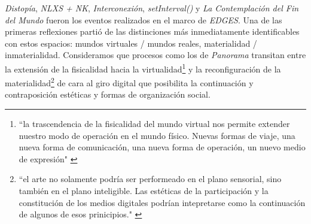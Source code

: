 

\iffalse
\begin{itemize}
\item Distopía
\item domo 
\item Underborders
\item Milena y Concepción
\item setInterval()
\item Contemplación del fin del Mundo
\item sistemas mixtos
\item espacio y performance fusionados en Contemplación
\end{itemize}
\fi


\textit{Distopía}, \textit{NLXS + NK}, \textit{Interconexión}, \textit{setInterval()} y \textit{La Contemplación del Fin del Mundo} fueron los eventos realizados en el marco de \textit{EDGES}. Una de las primeras reflexiones partió de las distinciones más inmediatamente identificables con estos espacios: mundos virtuales / mundos reales, materialidad / inmaterialidad. Consideramos que procesos como los de \textit{Panorama} transitan entre la extensión de la fisicalidad hacia la virtualidad\footnote{``la trascendencia de la fisicalidad del mundo virtual nos permite extender nuestro modo de operación en el mundo físico. Nuevas formas de viaje, una nueva forma de comunicación, una nueva forma de operación, un nuevo medio de expresión" \citep[pp.~49]{cyberspace}}  y la reconfiguración de la materialidad\footnote{``el arte no solamente podría ser performeado en el plano sensorial, sino también en el plano inteligible. Las estéticas de la participación y la constitución de los medios digitales podrían intepretarse como la continuación de algunos de esos prinicipios." \citep[pp.~190]{andreasosa}} de cara al giro digital que posibilita la continuación y contraposición estéticas y formas de organización social. 

\color{black}



